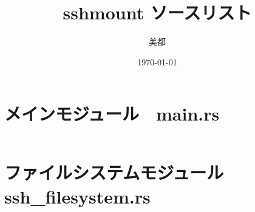 \documentclass[paper=a4paper, fontsize=10pt, head_space=10mm, foot_space=17mm, gutter=15mm, line_length=185mm]{jlreq}
\title{sshmount ソースリスト}
\author{美都}
\date{\today}
\begin{document}
\maketitle
\tableofcontents
\clearpage

\section{メインモジュール　main.rs}
\inputminted[linenos, breaklines]{rust}{src/main.rs}
\clearpage

\section{ファイルシステムモジュール ssh\_filesystem.rs}
\inputminted[linenos, breaklines]{rust}{src/ssh_filesystem.rs}
\end{document}

